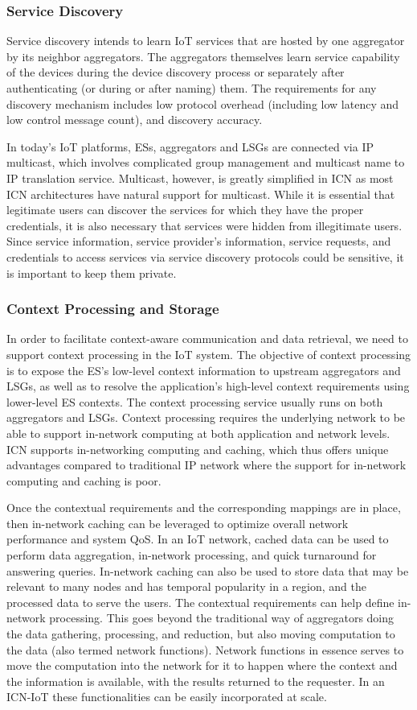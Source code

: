 \subsubsection{Service Discovery}
Service discovery intends to learn IoT services that are hosted by one aggregator by its neighbor aggregators. The aggregators themselves learn service capability of the devices during the device discovery process or separately after authenticating (or during or after naming) them. The requirements for any discovery mechanism includes low protocol overhead (including low latency and low control message count), and discovery accuracy.\par
In today's IoT platforms, ESs, aggregators and LSGs are connected via IP multicast, which involves complicated group management and multicast name to IP translation service. Multicast, however, is greatly simplified in ICN as most ICN architectures have natural support for multicast.
 While it is essential that legitimate users can discover the services for which they have the proper credentials, it is also necessary that services were hidden from illegitimate users. Since service information, service provider's information, service requests, and credentials to access services via service discovery protocols could be sensitive, it is important to keep them private. 

\subsubsection{Context Processing and Storage}
In order to facilitate context-aware communication and data retrieval, we need to support context processing in the IoT system. The objective of context processing is to expose the ES's low-level context information to upstream aggregators and LSGs, as well as to resolve the application's high-level context requirements using lower-level ES contexts. The context processing service usually runs on both aggregators and LSGs.
Context processing requires the underlying network to be able to support in-network computing at both application and network levels. ICN supports in-networking computing and caching, which thus offers unique advantages compared to traditional IP network where the support for in-network computing and caching is poor.\par 
Once the contextual requirements and the corresponding mappings are in place, then in-network caching can be leveraged to optimize overall network performance and system QoS. In an IoT network, cached data can be used to perform data aggregation, in-network processing, and quick turnaround for answering queries. In-network caching can also be used to store data that may be relevant to many nodes and has temporal popularity in a region, and the processed data to serve the users. The contextual requirements can help define in-network processing. This goes beyond the traditional way of aggregators doing the data gathering, processing, and reduction, but also moving computation to the data (also termed network functions). Network functions in essence serves to move the computation into the network for it to happen where the context and the information is available, with the results returned to the requester. In an ICN-IoT these functionalities can be easily incorporated at scale.
